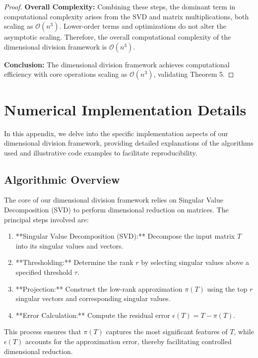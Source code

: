 \documentclass[sn-mathphys-num]{sn-jnl}
\theoremstyle{thmstyleone}
\theoremstyle{thmstyletwo}
\theoremstyle{thmstylethree}
\begin{document}
\begin{appendices}
\begin{proof}
\textbf{Overall Complexity:}
Combining these steps, the dominant term in computational complexity arises from the SVD and matrix multiplications, both scaling as \( \mathcal{O}(n^3) \). Lower-order terms and optimizations do not alter the asymptotic scaling. Therefore, the overall computational complexity of the dimensional division framework is \( \mathcal{O}(n^3) \).

\textbf{Conclusion:}
The dimensional division framework achieves computational efficiency with core operations scaling as \( \mathcal{O}(n^3) \), validating Theorem 5.
\end{proof}

\section{Numerical Implementation Details}\label{appB}

In this appendix, we delve into the specific implementation aspects of our dimensional division framework, providing detailed explanations of the algorithms used and illustrative code examples to facilitate reproducibility.

\subsection{Algorithmic Overview}

The core of our dimensional division framework relies on Singular Value Decomposition (SVD) to perform dimensional reduction on matrices. The principal steps involved are:

\begin{enumerate}
    \item **Singular Value Decomposition (SVD):** Decompose the input matrix \( T \) into its singular values and vectors.
    \item **Thresholding:** Determine the rank \( r \) by selecting singular values above a specified threshold \( \tau \).
    \item **Projection:** Construct the low-rank approximation \( \pi(T) \) using the top \( r \) singular vectors and corresponding singular values.
    \item **Error Calculation:** Compute the residual error \( \epsilon(T) = T - \pi(T) \).
\end{enumerate}

This process ensures that \( \pi(T) \) captures the most significant features of \( T \), while \( \epsilon(T) \) accounts for the approximation error, thereby facilitating controlled dimensional reduction.


\end{appendices}
\end{document}
